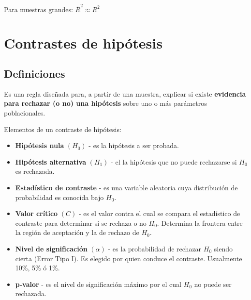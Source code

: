 \documentclass[10pt, a4paper, landscape]{article}
\begin{document}
\begin{multicols}{3}
Para muestras grandes: \( \overline{R}^{2} \approx R^{2} \)

\section*{Contrastes de hipótesis}

\subsection*{Definiciones}

Es una regla diseñada para, a partir de una muestra, explicar si existe \textbf{evidencia para rechazar (o no) una hipótesis} sobre uno o más parámetros poblacionales.

Elementos de un contraste de hipótesis:

\begin{itemize}[leftmargin=*]
	\item \textbf{Hipótesis nula} \( (H_{0}) \) - es la hipótesis a ser probada.
	\item \textbf{Hipótesis alternativa} \( (H_{1}) \) - el la hipótesis que no puede rechazarse si \( H_{0} \) es rechazada.
	\item \textbf{Estadístico de contraste} - es una variable aleatoria cuya distribución de probabilidad es conocida bajo \( H_{0} \).
	\item \textbf{Valor crítico} \( (C) \) - es el valor contra el cual se compara el estadístico de contraste para determinar si se rechaza o no \( H_{0} \). Determina la frontera entre la región de aceptación y la de rechazo de \( H_{0} \).
	\item \textbf{Nivel de significación} \( (\alpha) \) - es la probabilidad de rechazar \( H_{0} \) siendo cierta (Error Tipo I). Es elegido por quien conduce el contraste. Usualmente 10\%, 5\% ó 1\%.
	\item \textbf{p-valor} - es el nivel de significación máximo por el cual \( H_{0} \) no puede ser rechazada.
\end{itemize}

\setlength{\multicolsep}{0pt}
\setlength{\columnsep}{20pt}
\begin{multicols}{2}



\end{multicols}
\end{multicols}
\end{document}
